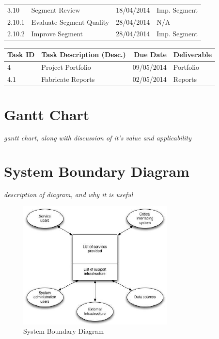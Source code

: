 \begin{tabular}{llrl}
    3.10     & Segment Review               & 18/04/2014  & Imp. Segment      \\
    2.10.1   & Evaluate Segment Quality     & 28/04/2014  & N/A               \\
    2.10.2   & Improve Segment              & 28/04/2014  & Imp. Segment      \\
    
    \bottomrule
\end{tabular}

\pagebreak

\begin{tabular}{llrl}
    
    \toprule
    
    Task ID  & Task Description (Desc.)     & Due Date    & Deliverable       \\
    
    \midrule
    
    4        & Project Portfolio            & 09/05/2014  & Portfolio         \\
    4.1      & Fabricate Reports            & 02/05/2014  & Reports           \\
    
    \bottomrule

\end{tabular}

\pagebreak

\section{Gantt Chart}
\textit{gantt chart, along with discussion of it's value and applicability}

\section{System Boundary Diagram}
\textit{description of diagram, and why it is useful}
\begin{figure}[h]
    \centering
    \includegraphics[width=0.7\textwidth]{images/requirements/system_boundary_diagram.png}
    \caption{System Boundary Diagram}
    \label{fig:sys_boundary_diag}
\end{figure}
